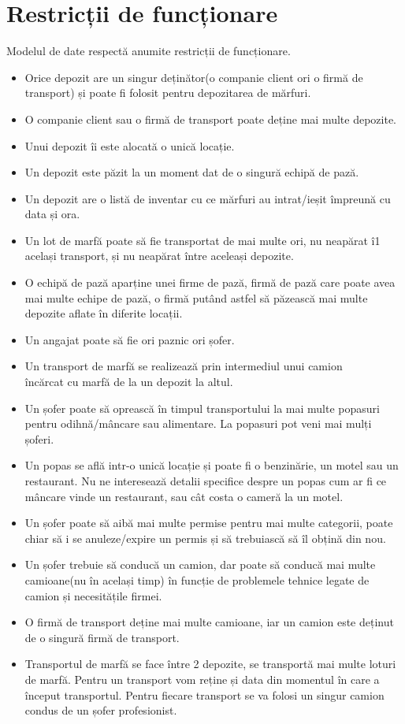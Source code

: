 \documentclass[12pt, a4paper]{article}
\begin{document}
\section{Restricții de funcționare}
\quad \par
Modelul de date respectă anumite restricții de funcționare.
\begin{itemize}
    \item Orice depozit are un singur deținător(o companie client ori o firmă de transport) și poate fi folosit pentru depozitarea de mărfuri.
    \item O companie client sau o firmă de transport poate deține mai multe depozite.
    \item Unui depozit îi este alocată o unică locație.
    \item Un depozit este păzit la un moment dat de o singură echipă de pază.
    \item Un depozit are o listă de inventar cu ce mărfuri au intrat/ieșit împreună cu data și ora.
    \item Un lot de marfă poate să fie transportat de mai multe ori, nu neapărat î1 același transport, și nu neapărat între aceleași depozite.
    \item O echipă de pază aparține unei firme de pază, firmă de pază care poate avea mai multe echipe de pază, o firmă putând astfel să păzească mai multe depozite aflate în diferite locații.
    \item Un angajat poate să fie ori paznic ori șofer.
    \item Un transport de marfă se realizează prin intermediul unui camion \\încărcat cu marfă de la un depozit la altul.
    \item Un șofer poate să oprească în timpul transportului la mai multe popasuri pentru odihnă/mâncare sau alimentare. La popasuri pot veni mai mulți șoferi.
    \item Un popas se află intr-o unică locație și poate fi o benzinărie, un motel sau un restaurant. Nu ne interesează detalii specifice despre un popas cum ar fi ce mâncare vinde un restaurant, sau cât costa o cameră la un motel.
    \item Un șofer poate să aibă mai multe permise pentru mai multe categorii, poate chiar să i se anuleze/expire un permis și să trebuiască să îl obțină din nou.
    \item Un șofer trebuie să conducă un camion, dar poate să conducă mai multe camioane(nu în același timp) în funcție de problemele tehnice legate de camion și necesitățile firmei.
    \item O firmă de transport deține mai multe camioane, iar un camion este deținut de o singură firmă de transport.
    \item Transportul de marfă se face între 2 depozite, se transportă mai multe loturi de marfă. Pentru un transport vom reține și data din momentul în care a început transportul. Pentru fiecare transport se va folosi un singur camion condus de un șofer profesionist.
\end{itemize}
\end{document}
